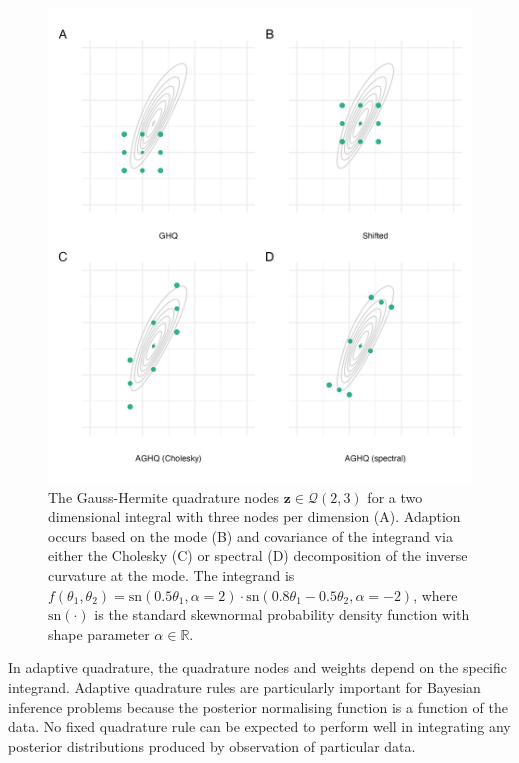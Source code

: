\documentclass[a4paper, nobind]{templates/ociamthesis}
\begin{document}
\begin{figure}

{\centering \includegraphics[width=0.95\linewidth]{figures/naomi-aghq/aghq-demo} 

}

\caption{The Gauss-Hermite quadrature nodes \(\mathbf{z} \in \mathcal{Q}(2, 3)\) for a two dimensional integral with three nodes per dimension (A). Adaption occurs based on the mode (B) and covariance of the integrand via either the Cholesky (C) or spectral (D) decomposition of the inverse curvature at the mode. The integrand is \(f(\theta_1, \theta_2) = \text{sn}(0.5 \theta_1, \alpha = 2) \cdot \text{sn}(0.8 \theta_1 - 0.5 \theta_2, \alpha = -2)\), where \(\text{sn}(\cdot)\) is the standard skewnormal probability density function with shape parameter \(\alpha \in \mathbb{R}\).}\label{fig:aghq-demo}
\end{figure}

In adaptive quadrature, the quadrature nodes and weights depend on the specific integrand.
Adaptive quadrature rules are particularly important for Bayesian inference problems because the posterior normalising function is a function of the data.
No fixed quadrature rule can be expected to perform well in integrating any posterior distributions produced by observation of particular data.
\end{document}
